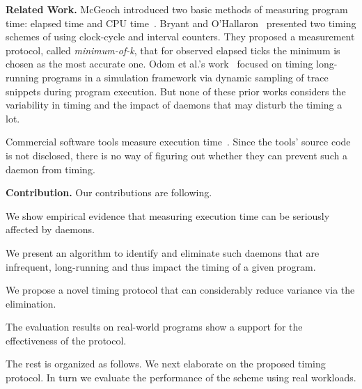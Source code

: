 \documentclass[letter]{ieice}
\begin{document}
{\bf Related Work.} 
McGeoch introduced
two basic methods of measuring program time: elapsed time and CPU time~\cite{Mcgeoch12}. 
Bryant and O'Hallaron~\cite{Randal03} 
presented two timing schemes of using clock-cycle and interval counters. 
They proposed a measurement protocol, called {\em minimum-of-k}, 
that for observed elapsed ticks the minimum is chosen as the most accurate one. 
Odom et al.'s work~\cite{Odom05} focused on timing long-running programs 
in a simulation framework via dynamic sampling of trace snippets during program execution. 
But none of these prior works considers the variability in 
timing and the impact of daemons that may disturb the timing a lot.

Commercial software tools measure execution time~\cite{VTune,TimeSys,WindView}. 
Since the tools' source code is not disclosed, there is no way of figuring out 
whether they can prevent such a daemon from timing. 

{\bf Contribution.} 
Our contributions are following.
\vspace{-0.1in}
\begin{itemize}

\item We show empirical evidence that 
measuring execution time 
can be seriously affected by daemons.

{\color{blue}

\item We present an algorithm to identify and eliminate such daemons that are infrequent, \hbox{long-running} 
and thus impact the timing of a given program.

\item We propose a novel timing protocol that can considerably 
reduce variance via the elimination. 

\item The evaluation results on real-world programs 
show a support for the effectiveness of the protocol. 
}

\end{itemize}
\vspace{-0.2in}

\noindent
The rest is organized as follows. 
We next elaborate on the proposed timing protocol. In turn we evaluate the performance of the scheme using real workloads. 
\end{document}

